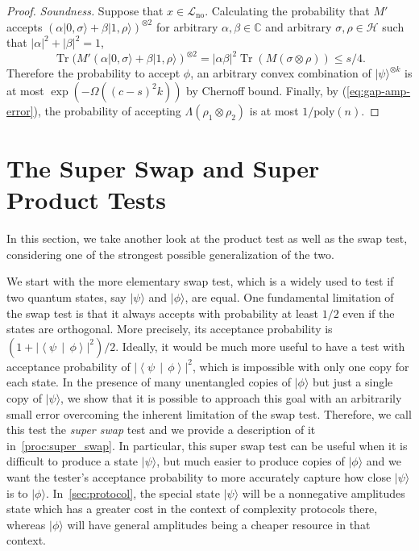 \documentclass[10pt,a4paper]{article}
\theoremstyle{remark}
\def\cal{\mathcal}
\newcommand{\C}{{\mathbb C}}
\newcommand{\abs}[1]{\ensuremath{\left\lvert #1 \right\rvert}}
\newcommand{\calH}{{\cal H}}
\newcommand{\calL}{{\cal L}}
\newcommand{\poly}{{\mathrm{poly}}}
\newcommand{\1}[1]{\mathds{1}{[#1]}}
\newcommand{\ket}[1]{\lvert #1\rangle}
\newcommand{\braket}[2]{\left\langle #1 \,\middle\vert\, #2\right\rangle}
\newcommand{\trace}{\operatorname{Tr}}
\numberwithin{equation}{section}
\begin{document}
\begin{proof}
\emph{Soundness.} Suppose that $x\in\calL_{\mathrm{no}}$. 
Calculating the probability that $M'$ accepts $(\alpha|0,\sigma\rangle+\beta|1,\rho\rangle)^{\otimes 2}$ for arbitrary $\alpha,\beta \in \C$ and arbitrary $\sigma, \rho\in \calH$ such that $|\alpha|^2+|\beta|^2=1$,
\[
    \trace( M' (\alpha|0,\sigma\rangle+\beta|1,\rho\rangle)^{\otimes 2}
     =|\alpha\beta|^2\trace( M (\sigma\otimes \rho))\le s/4.
\]
Therefore the probability to accept $\phi$, an arbitrary convex combination of $\ket\psi^{\otimes k}$ is at most $\exp(-\Omega((c-s)^2 k))$ by Chernoff bound. Finally, by (\ref{eq:gap-amp-error}), the probability of accepting $\Lambda(\rho_1\otimes\rho_2)$ is at most $1/\poly(n).$
\end{proof}


\section{The Super Swap and Super Product Tests}\label{sec:super_swap}
In this section, we take another look at the product test as well as the swap test, considering one of the strongest possible generalization of the two.

We start with the more elementary swap test, which is a widely used to test if two quantum states, say $\ket{\psi}$ and $\ket{\phi}$, are equal.
One fundamental limitation of the swap test is that it always accepts with probability at least $1/2$ even if
the states are orthogonal. More precisely, its acceptance probability is $(1+\abs{\braket{\psi}{\phi}}^2)/2$.
Ideally, it would be much more useful to have a test with acceptance probability of $\abs{\braket{\psi}{\phi}}^2$, which is impossible with only one copy for each state.
In the presence of many unentangled copies of $\ket{\phi}$ but just a single copy of $\ket{\psi}$, we show that it
is possible to approach this goal with an arbitrarily small error overcoming the inherent limitation of the swap test. Therefore, we call this test the \emph{super swap} test
and we provide a description of it in~\cref{proc:super_swap}. In particular, this super swap test can be useful
when it is difficult to produce a state $\ket{\psi}$, but much easier to produce copies of $\ket{\phi}$
and we want the tester's acceptance probability to more accurately capture how close $\ket{\psi}$ is to $\ket{\phi}$.
In~\cref{sec:protocol}, the special state $\ket{\psi}$ will be a nonnegative amplitudes state which has a greater cost in the
context of complexity protocols there, whereas $\ket{\phi}$ will have general amplitudes being a cheaper resource in that context.  
\end{document}
